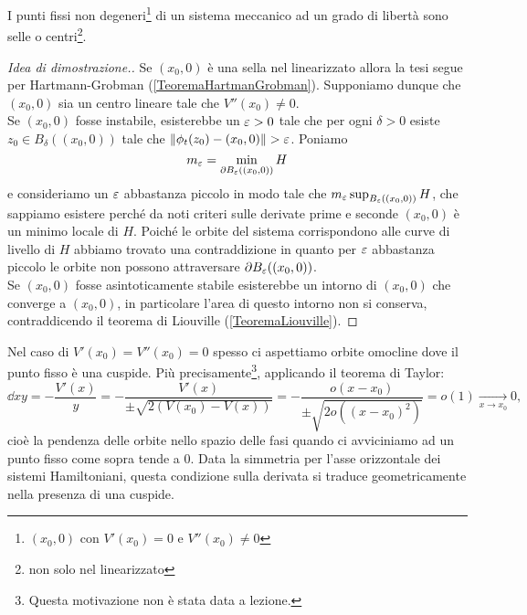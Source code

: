 \begin{proposition}\label{CaratterizzazionePuntiFissiSistemaMeccanico1GradoLiberta}
I punti fissi non degeneri\footnote{$(x_0,0)$ con $V'(x_0)=0$ e $V''(x_0)\neq 0$} di un sistema meccanico ad un grado di libert\`a sono selle o centri\footnote{non solo nel linearizzato}.
\end{proposition}
\begin{proof}[Idea di dimostrazione.]
Se $(x_0,0)$ \`e una sella nel linearizzato allora la tesi segue per Hartmann-Grobman (\ref{TeoremaHartmanGrobman}). Supponiamo dunque che $(x_0,0)$ sia un centro lineare tale che $V''(x_0)\neq 0$.\\
Se $(x_0,0)$ fosse instabile, esisterebbe un $\varepsilon>0$ tale che per ogni $\delta>0$ esiste $z_0\in B_\delta((x_0,0))$ tale che $\left\Vert{\phi_t(z_0)-(x_0,0)}\right\Vert>\varepsilon$. Poniamo
\[m_\varepsilon=\min_{\partial{B_\varepsilon((x_0,0))}} H\]
e consideriamo un $\varepsilon$ abbastanza piccolo in modo tale che $m_\varepsilon\sup_{B_\varepsilon((x_0,0))} H$, che sappiamo esistere perch\'e da noti criteri sulle derivate prime e seconde $(x_0,0)$ \`e un minimo locale di $H$.
Poich\'e le orbite del sistema corrispondono alle curve di livello di $H$ abbiamo trovato una contraddizione in quanto per $\varepsilon$ abbastanza piccolo le orbite non possono attraversare $\partial B_\varepsilon((x_0,0))$.\\
Se $(x_0,0)$ fosse asintoticamente stabile esisterebbe un intorno di $(x_0,0)$ che converge a $(x_0,0)$, in particolare l'area di questo intorno non si conserva, contraddicendo il teorema di Liouville (\ref{TeoremaLiouville}).
\end{proof}
\medskip

\noindent
Nel caso di $V'(x_0)=V''(x_0)=0$ spesso ci aspettiamo orbite omocline dove il punto fisso \`e una cuspide. Pi\`u precisamente\footnote{Questa motivazione non \`e stata data a lezione.}, applicando il teorema di Taylor:
\[\dd xy=-\frac{V'(x)}{y}=-\frac{V'(x)}{\pm \sqrt{2(V(x_0)-V(x))}}=-\frac{o(x-x_0)}{\pm\sqrt{2o((x-x_0)^2)}}=o(1)\underset{x\to x_0}{\longrightarrow}0,\]
cio\`e la pendenza delle orbite nello spazio delle fasi quando ci avviciniamo ad un punto fisso come sopra tende a $0$. Data la simmetria per l'asse orizzontale dei sistemi Hamiltoniani, questa condizione sulla derivata si traduce geometricamente nella presenza di una cuspide.